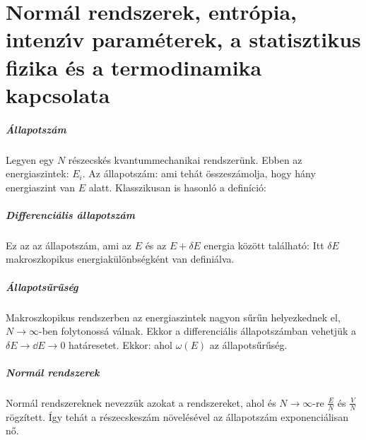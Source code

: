 \chapter{Norm\'al rendszerek, entr\'opia, intenz\'{\i}v param\'eterek, a statisztikus fizika \'es a termodinamika kapcsolata} 
 
 \paragraph{Állapotszám}
  
  Legyen egy $N$ részecskés kvantummechanikai rendszerünk.
   Ebben az energiaszintek: $E_i$.
   Az állapotszám:
  ami tehát összeszámolja, hogy hány energiaszint van $E$ alatt.
   Klasszikusan is hasonló a definíció:
  
 \paragraph{Differenciális állapotszám}
  
  Ez az az állapotszám, ami az $E$ és az $E+\delta E$ energia között található:
  Itt $\delta E$ makroszkopikus energiakülönbségként van definiálva.
  
 \paragraph{Állapotsűrűség}
  
  Makroszkopikus rendszerben az energiaszintek nagyon sűrűn helyezkednek el, $N\to\infty$-ben folytonossá válnak.
   Ekkor a differenciális állapotszámban vehetjük a $\delta E\to\dd E\to 0$ határesetet.
   Ekkor:
  ahol $\omega(E)$ az állapotsűrűség. 
  
 \paragraph{Normál rendszerek}
  
  Normál rendszereknek nevezzük azokat a rendszereket, ahol 
  és $N\to\infty$-re $\frac{E}{N}$ és $\frac{V}{N}$ rögzített. Így tehát a részecskeszám növelésével az állapotszám exponenciálisan nő. 
  
